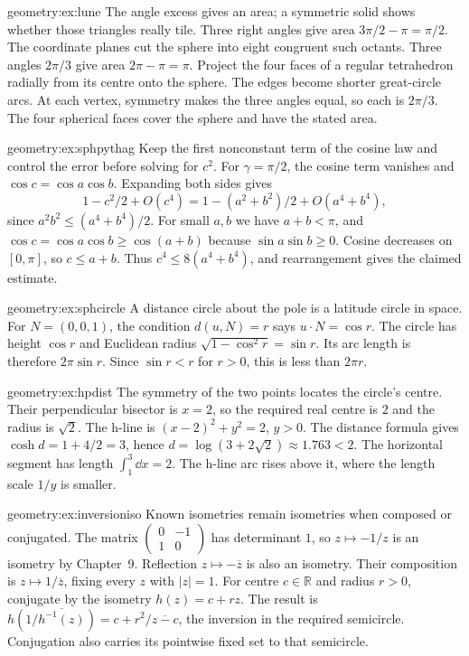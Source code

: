 \begin{solution}{geometry:ex:lune}
\idea The angle excess gives an area; a symmetric solid shows whether those
triangles really tile.
\writeup Three right angles give area $3\pi/2-\pi=\pi/2$.
The coordinate planes cut the sphere into eight congruent such octants.
Three angles $2\pi/3$ give area $2\pi-\pi=\pi$.
Project the four faces of a regular tetrahedron radially from its centre
onto the sphere. The edges become shorter great-circle arcs. At each
vertex, symmetry makes the three angles equal, so each is $2\pi/3$.
The four spherical faces cover the sphere and have the stated area.
\end{solution}
\begin{solution}{geometry:ex:sphpythag}
\idea Keep the first nonconstant term of the cosine law and control the
error before solving for $c^2$.
\writeup For $\gamma=\pi/2$, the cosine term vanishes and
$\cos c=\cos a\cos b$. Expanding both sides gives
\[
 1-c^2/2+O(c^4)=1-(a^2+b^2)/2+O(a^4+b^4),
\]
since $a^2b^2\le(a^4+b^4)/2$. For small $a,b$ we have $a+b<\pi$, and
$\cos c=\cos a\cos b\ge\cos(a+b)$ because $\sin a\sin b\ge0$.
Cosine decreases on $[0,\pi]$, so $c\le a+b$.
Thus $c^4\le8(a^4+b^4)$, and rearrangement gives the claimed estimate.
\end{solution}
\begin{solution}{geometry:ex:sphcircle}
\idea A distance circle about the pole is a latitude circle in space.
\writeup For $N=(0,0,1)$, the condition $d(u,N)=r$ says
$u\cdot N=\cos r$. The circle has height $\cos r$ and Euclidean radius
$\sqrt{1-\cos^2r}=\sin r$. Its arc length is therefore $2\pi\sin r$.
Since $\sin r<r$ for $r>0$, this is less than $2\pi r$.
\end{solution}
\begin{solution}{geometry:ex:hpdist}
\idea The symmetry of the two points locates the circle's centre.
\writeup Their perpendicular bisector is $x=2$, so the required real
centre is $2$ and the radius is $\sqrt2$. The h-line is
$(x-2)^2+y^2=2$, $y>0$.
The distance formula gives $\cosh d=1+4/2=3$, hence
$d=\log(3+2\sqrt2)\approx1.763<2$.
The horizontal segment has length $\int_1^3\dd x=2$.
The h-line arc rises above it, where the length scale $1/y$ is smaller.
\end{solution}
\begin{solution}{geometry:ex:inversioniso}
\idea Known isometries remain isometries when composed or conjugated.
\writeup The matrix $\left(\begin{smallmatrix}0&-1\\1&0\end{smallmatrix}\right)$
has determinant $1$, so $z\mapsto-1/z$ is an isometry by Chapter~9.
Reflection $z\mapsto-\overline z$ is also an isometry. Their composition
is $z\mapsto1/\overline z$, fixing every $z$ with $|z|=1$.
For centre $c\in\mathbb R$ and radius $r>0$, conjugate by the isometry
$h(z)=c+rz$. The result is
$h(1/\overline{h^{-1}(z)})=c+r^2/\overline{z-c}$,
the inversion in the required semicircle. Conjugation also carries its
pointwise fixed set to that semicircle.
\end{solution}
